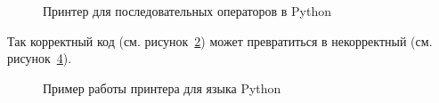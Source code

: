 \begin{figure}[h!]
	
	\caption{Принтер для последовательных операторов в Python}
	\label{fig:pythonPrinter}
\end{figure}

Так корректный код (см. рисунок~\ref{fig:pythonCode}) может превратиться в некорректный (см. рисунок~\ref{fig:pythonCodeBad}).
\begin{figure}[h!]
	\begin{subfigure}[b]{0.45\linewidth}
		
		\caption{}
		\label{fig:pythonCode}
	\end{subfigure}
	\hspace{0.5cm}
	\begin{subfigure}[b]{0.45\linewidth}
		
		\caption{}
		\label{fig:pythonCodeBad}
	\end{subfigure}
	\caption{Пример работы принтера для языка Python}
\end{figure}